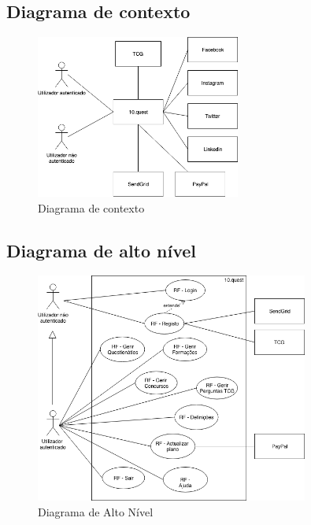 \newpage

\subsection{Diagrama de contexto}
\label{d:contexto}
\begin{figure}[ht!]
	\begin{center}
		\includegraphics[width=0.6\textwidth]{img/rf/10quest}
		\caption{Diagrama de contexto}
		\label{fig:rf-10quest}
	\end{center}
\end{figure}

\newpage

\subsection{Diagrama de alto nível}
\label{d:altonivel}
\begin{figure}[ht!]
	\begin{center}
		\includegraphics[width=0.8\textwidth]{img/rf/alto-nivel}
		\caption{Diagrama de Alto Nível}
		\label{fig:rf-alto-nivel}
	\end{center}
\end{figure}

